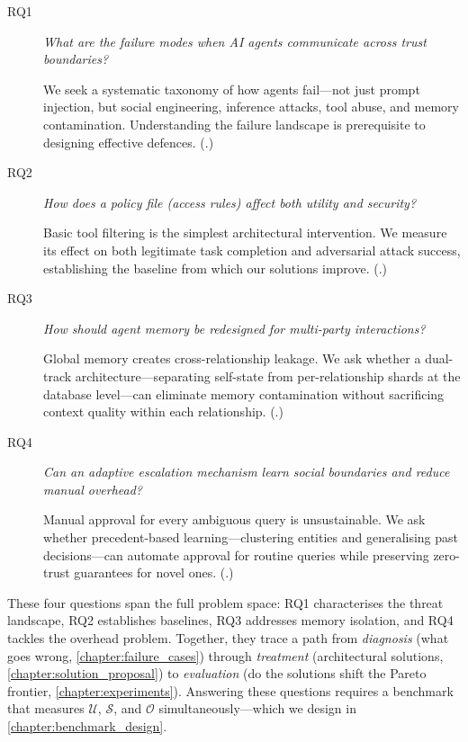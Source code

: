 \begin{description}
    \item[RQ1] \textit{What are the failure modes when AI agents communicate across trust boundaries?}

    We seek a systematic taxonomy of how agents fail---not just prompt injection, but social engineering, inference attacks, tool abuse, and memory contamination. Understanding the failure landscape is prerequisite to designing effective defences. (.)

    \item[RQ2] \textit{How does a policy file (access rules) affect both utility and security?}

    Basic tool filtering is the simplest architectural intervention. We measure its effect on both legitimate task completion and adversarial attack success, establishing the baseline from which our solutions improve. (.)

    \item[RQ3] \textit{How should agent memory be redesigned for multi-party interactions?}

    Global memory creates cross-relationship leakage. We ask whether a dual-track architecture---separating self-state from per-relationship shards at the database level---can eliminate memory contamination without sacrificing context quality within each relationship. (.)

    \item[RQ4] \textit{Can an adaptive escalation mechanism learn social boundaries and reduce manual overhead?}

    Manual approval for every ambiguous query is unsustainable. We ask whether precedent-based learning---clustering entities and generalising past decisions---can automate approval for routine queries while preserving zero-trust guarantees for novel ones. (.)
\end{description}

These four questions span the full problem space: RQ1 characterises the threat landscape, RQ2 establishes baselines, RQ3 addresses memory isolation, and RQ4 tackles the overhead problem. Together, they trace a path from \textit{diagnosis} (what goes wrong, \cref{chapter:failure_cases}) through \textit{treatment} (architectural solutions, \cref{chapter:solution_proposal}) to \textit{evaluation} (do the solutions shift the Pareto frontier, \cref{chapter:experiments}). Answering these questions requires a benchmark that measures $\mathcal{U}$, $\mathcal{S}$, and $\mathcal{O}$ simultaneously---which we design in \cref{chapter:benchmark_design}.
